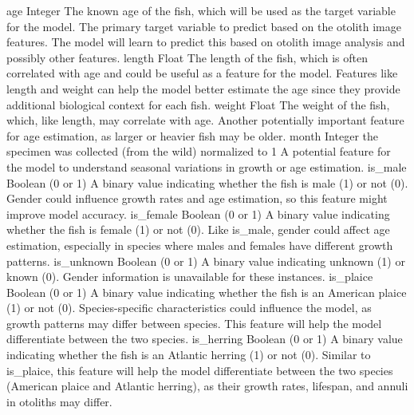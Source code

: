  age
 Integer
 The known age of the fish, which will be used as the target variable for the model.
 The primary target variable to predict based on the otolith image features. The model will learn to predict this based on otolith image analysis and possibly other features.
 length
 Float
 The length of the fish, which is often correlated with age and could be useful as a feature for the model.
 Features like length and weight can help the model better estimate the age since they provide additional biological context for each fish.
 weight
 Float
 The weight of the fish, which, like length, may correlate with age.
 Another potentially important feature for age estimation, as larger or heavier fish may be older.
 month
 Integer
 the specimen was collected (from the wild) normalized to 1
 A potential feature for the model to understand seasonal variations in growth or age estimation.
 is_male
 Boolean (0 or 1)
 A binary value indicating whether the fish is male (1) or not (0).
 Gender could influence growth rates and age estimation, so this feature might improve model accuracy.
 is_female
 Boolean (0 or 1)
 A binary value indicating whether the fish is female (1) or not (0).
 Like is_male, gender could affect age estimation, especially in species where males and females have different growth patterns.
 is_unknown
 Boolean (0 or 1)
 A binary value indicating unknown (1) or known (0).
 Gender information is unavailable for these instances.
 is_plaice
 Boolean (0 or 1)
 A binary value indicating whether the fish is an American plaice (1) or not (0).
 Species-specific characteristics could influence the model, as growth patterns may differ between species. This feature will help the model differentiate between the two species.
 is_herring
 Boolean (0 or 1)
 A binary value indicating whether the fish is an Atlantic herring (1) or not (0).
 Similar to is_plaice, this feature will help the model differentiate between the two species (American plaice and Atlantic herring), as their growth rates, lifespan, and annuli in otoliths may differ.
